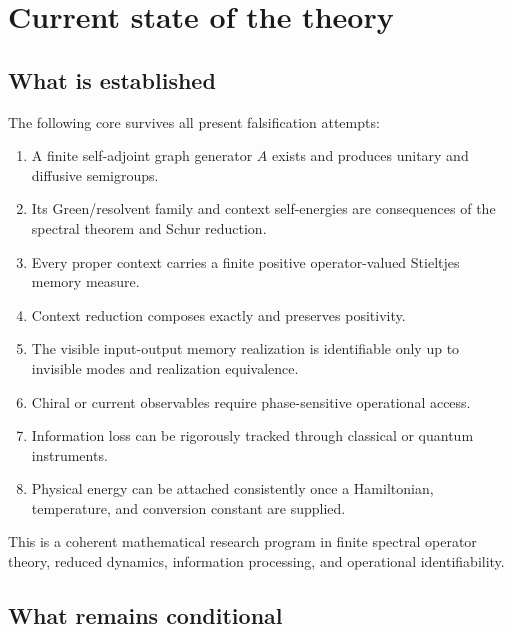 \documentclass[11pt,a4paper,openany]{report}
\begin{document}
\chapter{Current state of the theory}

\section{What is established}

The following core survives all present falsification attempts:

\begin{enumerate}
\item 
A finite self-adjoint graph generator \(A\) exists and produces unitary and diffusive semigroups.

\item 
Its Green/\allowbreak{}resolvent family and context self-energies are consequences of the spectral theorem and Schur reduction.

\item 
Every proper context carries a finite positive operator-valued Stieltjes memory measure.

\item 
Context reduction composes exactly and preserves positivity.

\item 
The visible input-output memory realization is identifiable only up to invisible modes and realization equivalence.

\item 
Chiral or current observables require phase-sensitive operational access.

\item 
Information loss can be rigorously tracked through classical or quantum instruments.

\item 
Physical energy can be attached consistently once a Hamiltonian, temperature, and conversion constant are supplied.

\end{enumerate}

This is a coherent mathematical research program in finite spectral operator theory, reduced dynamics, information processing, and operational identifiability.

\section{What remains conditional}
\end{document}
